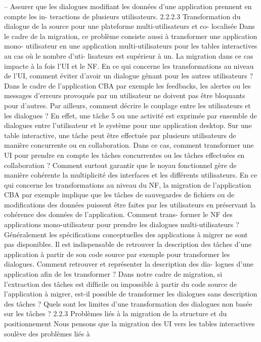\documentclass{article}
\begin{document}
– Assurer que les dialogues modiﬁant les données d’une application prennent en compte les in-
teractions de plusieurs utilisateurs.
2.2.2.3
Transformation du dialogue de la source pour une plateforme multi-utilisateurs et co-
localisée
Dans le cadre de la migration, ce problème consiste aussi à transformer une application mono-
utilisateur en une application multi-utilisateurs pour les tables interactives au cas où le nombre d’uti-
lisateurs est supérieur à un. La migration dans ce cas impacte à la fois l’UI et le NF.
En ce qui concerne les transformations au niveau de l’UI, comment éviter d’avoir un dialogue
gênant pour les autres utilisateurs ? Dans le cadre de l’application CBA par exemple les feedbacks,
les alertes ou les messages d’erreurs provoqués par un utilisateur ne doivent pas être bloquants pour
d’autres. Par ailleurs, comment décrire le couplage entre les utilisateurs et les dialogues ? En effet,
une tâche 5 ou une activité est exprimée par ensemble de dialogues entre l’utilisateur et le système
pour une application desktop. Sur une table interactive, une tâche peut être effectuée par plusieurs
utilisateurs de manière concurrente ou en collaboration. Dans ce cas, comment transformer une UI
pour prendre en compte les tâches concurrentes ou les tâches effectuées en collaboration ? Comment
surtout garantir que le noyau fonctionnel gère de manière cohérente la multiplicité des interfaces et
les différents utilisateurs.
En ce qui concerne les transformations au niveau du NF, la migration de l’application CBA par
exemple implique que les tâches de sauvegardes de ﬁchiers ou de modiﬁcations des données puissent
être faites par les utilisateurs en préservant la cohérence des données de l’application. Comment trans-
former le NF des applications mono-utilisateur pour prendre les dialogues multi-utilisateurs ?
Généralement les spéciﬁcations conceptuelles des applications à migrer ne sont pas disponibles. Il
est indispensable de retrouver la description des tâches d’une application à partir de son code source
par exemple pour transformer les dialogues. Comment retrouver et représenter la description des dia-
logues d’une application aﬁn de les transformer ? Dans notre cadre de migration, si l’extraction des
tâches est difﬁcile ou impossible à partir du code source de l’application à migrer, est-il possible de
transformer les dialogues sans description des tâches ? Quels sont les limites d’une transformation des
dialogues non basée sur les tâches ?
2.2.3
Problèmes liés à la migration de la structure et du positionnement
Nous pensons que la migration des UI vers les tables interactives soulève des problèmes liés à
\end{document}
